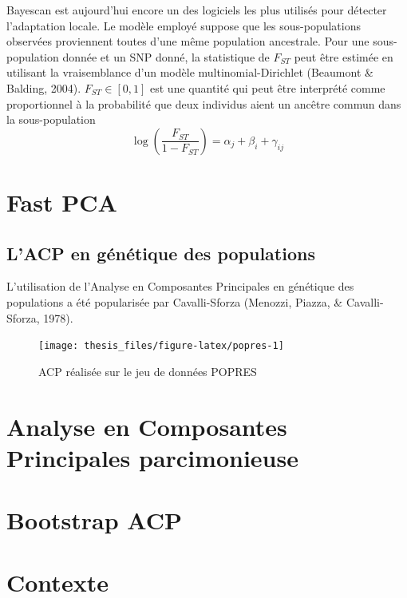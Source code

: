\documentclass[12pt,twoside]{ugathesis}
\begin{document}
  Bayescan est aujourd'hui encore un des logiciels les plus utilisés pour
  détecter l'adaptation locale. Le modèle employé suppose que les
  sous-populations observées proviennent toutes d'une même population
  ancestrale. Pour une sous-population donnée et un SNP donné, la
  statistique de \(F_{ST}\) peut être estimée en utilisant la
  vraisemblance d'un modèle multinomial-Dirichlet (Beaumont \& Balding,
  2004). \(F_{ST} \in [0, 1]\) est une quantité qui peut être interprété
  comme proportionnel à la probabilité que deux individus aient un ancêtre
  commun dans la sous-population
  \begin{equation} 
    \log \left( \frac{F_{ST}}{1 - F_{ST}} \right) = \alpha_j + \beta_i + \gamma_{ij}
    \label{eq:Bayescan-statistic}
  \end{equation}
  \section{Fast PCA}\label{fast-pca}
  
  \subsection{L'ACP en génétique des
  populations}\label{lacp-en-genetique-des-populations}
  
  L'utilisation de l'Analyse en Composantes Principales en génétique des
  populations a été popularisée par Cavalli-Sforza (Menozzi, Piazza, \&
  Cavalli-Sforza, 1978).
  \begin{figure}
  
  {\centering \texttt{[image: thesis\_files/figure-latex/popres-1]} 
  
  }
  
  \caption{ACP réalisée sur le jeu de données POPRES}\label{fig:popres}
  \end{figure}
  \section{Analyse en Composantes Principales
  parcimonieuse}\label{analyse-en-composantes-principales-parcimonieuse}
  
  \section{Bootstrap ACP}\label{bootstrap-acp}
  
  \section{Contexte}\label{contexte}
  
\end{document}
